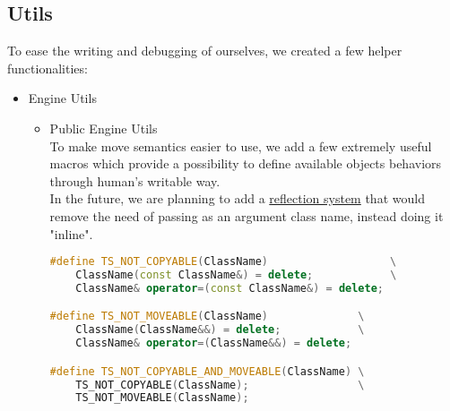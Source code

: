 \newpage
\subsection{Utils}
To ease the writing and debugging of ourselves, we created a few helper functionalities:

\begin{itemize}
    \item Engine Utils
    \begin{itemize}
        \item Public Engine Utils\\
        To make move semantics easier to use, we add a few extremely useful macros which provide a possibility to define available objects behaviors through human's writable way.\\
        In the future, we are planning to add a \hyperref[sec:refl]{reflection system} that would remove the need of passing as an argument class name, instead doing it "inline".\\
        
\begin{lstlisting}[language=c++, caption=Macros of Public Engine Utils(./engine/include/tsengine/utils.hpp)]
#define TS_NOT_COPYABLE(ClassName)                   \
    ClassName(const ClassName&) = delete;            \
    ClassName& operator=(const ClassName&) = delete;

#define TS_NOT_MOVEABLE(ClassName)              \
    ClassName(ClassName&&) = delete;            \
    ClassName& operator=(ClassName&&) = delete;

#define TS_NOT_COPYABLE_AND_MOVEABLE(ClassName) \
    TS_NOT_COPYABLE(ClassName);                 \
    TS_NOT_MOVEABLE(ClassName);


\end{lstlisting}
\end{itemize}
\end{itemize}
